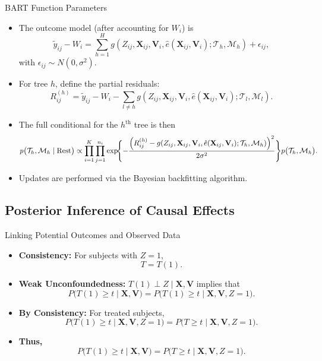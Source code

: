 \begin{frame}{BART Function Parameters}
  \begin{itemize}
    \item The outcome model (after accounting for \(W_i\)) is
      \[
      \tilde{y}_{ij} - W_i = \sum_{h=1}^{H} g(Z_{ij},\mathbf{X}_{ij},\mathbf{V}_i,\hat{e}(\mathbf{X}_{ij},\mathbf{V}_i); \mathcal{T}_h,\mathcal{M}_h) + \epsilon_{ij},
      \]
      with \(\epsilon_{ij} \sim N(0,\sigma^2)\).
    \item For tree \(h\), define the partial residuals:
      \[
      R_{ij}^{(h)} = \tilde{y}_{ij} - W_i - \sum_{l\neq h} g(Z_{ij},\mathbf{X}_{ij},\mathbf{V}_i,\hat{e}(\mathbf{X}_{ij},\mathbf{V}_i); \mathcal{T}_l,\mathcal{M}_l).
      \]
    \item The full conditional for the \(h^{\text{th}}\) tree is then
      \[
      p\bigl(\mathcal{T}_h,\mathcal{M}_h\mid \text{Rest}\bigr) \propto \prod_{i=1}^{K}\prod_{j=1}^{n_i} \exp\!\Biggl\{-\frac{\Bigl(R_{ij}^{(h)}- g(Z_{ij},\mathbf{X}_{ij},\mathbf{V}_i,\hat{e}(\mathbf{X}_{ij},\mathbf{V}_i);\mathcal{T}_h,\mathcal{M}_h)\Bigr)^2}{2\sigma^2}\Biggr\} p\bigl(\mathcal{T}_h,\mathcal{M}_h\bigr).
      \]
    \item Updates are performed via the Bayesian backfitting algorithm.
  \end{itemize}
\end{frame}

\subsection{Posterior Inference of Causal Effects}
\begin{frame}{Linking Potential Outcomes and Observed Data}
  \begin{itemize}
    \item \textbf{Consistency:} For subjects with \(Z=1\),
      \[
      T = T(1).
      \]
    \item \textbf{Weak Unconfoundedness:} \(T(1) \perp Z \mid \mathbf{X},\mathbf{V}\) implies that
      \[
      P\bigl(T(1) \ge t \mid \mathbf{X},\mathbf{V}\bigr) = P\bigl(T(1) \ge t \mid \mathbf{X},\mathbf{V},Z=1\bigr).
      \]
    \item \textbf{By Consistency:} For treated subjects,
      \[
      P\bigl(T(1) \ge t \mid \mathbf{X},\mathbf{V},Z=1\bigr) = P\bigl(T \ge t \mid \mathbf{X},\mathbf{V},Z=1\bigr).
      \]
    \item \textbf{Thus,}
      \[
      P\bigl(T(1) \ge t \mid \mathbf{X},\mathbf{V}\bigr) = P\bigl(T \ge t \mid \mathbf{X},\mathbf{V},Z=1\bigr).
      \]
  \end{itemize}
\end{frame}

